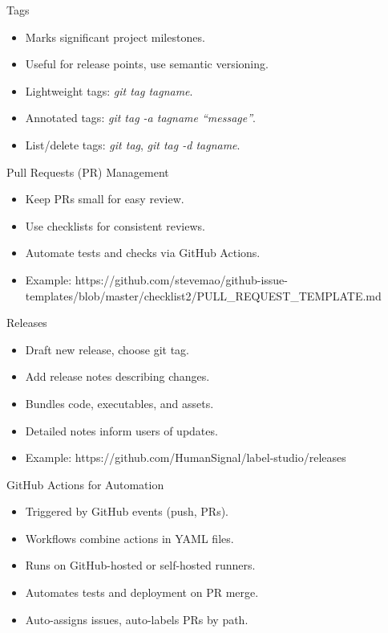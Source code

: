 \documentclass[aspectratio=169]{beamer}
\begin{document}
\begin{frame}{Tags}
    \begin{itemize}
        \item Marks significant project milestones.
        \item Useful for release points, use semantic versioning.
        \item Lightweight tags: \textit{git tag tagname}.
        \item Annotated tags: \textit{git tag -a tagname ``message''}.
        \item List/delete tags: \textit{git tag}, \textit{git tag -d tagname}.
    \end{itemize}
\end{frame}    
\begin{frame}{Pull Requests (PR) Management}
    \begin{itemize}
        \item Keep PRs small for easy review.
        \item Use checklists for consistent reviews.
        \item Automate tests and checks via GitHub Actions.
        \item Example: https://github.com/stevemao/github-issue-templates/blob/master/checklist2/PULL\_REQUEST\_TEMPLATE.md
    \end{itemize}
\end{frame}
\begin{frame}{Releases}
    \begin{itemize}
        \item Draft new release, choose git tag.
        \item Add release notes describing changes.
        \item Bundles code, executables, and assets.
        \item Detailed notes inform users of updates.
        \item Example: https://github.com/HumanSignal/label-studio/releases
    \end{itemize}
\end{frame}
\begin{frame}{GitHub Actions for Automation}
    \begin{itemize}
        \item Triggered by GitHub events (push, PRs).
        \item Workflows combine actions in YAML files.
        \item Runs on GitHub-hosted or self-hosted runners.
        \item Automates tests and deployment on PR merge.
        \item Auto-assigns issues, auto-labels PRs by path.
    \end{itemize}
\end{frame}
\end{document}
